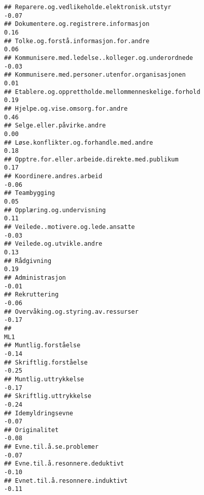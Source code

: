 \documentclass[
]{article}
\begin{document}
\begin{verbatim}
## Reparere.og.vedlikeholde.elektronisk.utstyr                                      -0.07
## Dokumentere.og.registrere.informasjon                                             0.16
## Tolke.og.forstå.informasjon.for.andre                                             0.06
## Kommunisere.med.ledelse..kolleger.og.underordnede                                -0.03
## Kommunisere.med.personer.utenfor.organisasjonen                                   0.01
## Etablere.og.opprettholde.mellommenneskelige.forhold                               0.19
## Hjelpe.og.vise.omsorg.for.andre                                                   0.46
## Selge.eller.påvirke.andre                                                         0.00
## Løse.konflikter.og.forhandle.med.andre                                            0.18
## Opptre.for.eller.arbeide.direkte.med.publikum                                     0.17
## Koordinere.andres.arbeid                                                         -0.06
## Teambygging                                                                       0.05
## Opplæring.og.undervisning                                                         0.11
## Veilede..motivere.og.lede.ansatte                                                -0.03
## Veilede.og.utvikle.andre                                                          0.13
## Rådgivning                                                                        0.19
## Administrasjon                                                                   -0.01
## Rekruttering                                                                     -0.06
## Overvåking.og.styring.av.ressurser                                               -0.17
##                                                                                    ML1
## Muntlig.forståelse                                                               -0.14
## Skriftlig.forståelse                                                             -0.25
## Muntlig.uttrykkelse                                                              -0.17
## Skriftlig.uttrykkelse                                                            -0.24
## Idemyldringsevne                                                                 -0.07
## Originalitet                                                                     -0.08
## Evne.til.å.se.problemer                                                          -0.07
## Evne.til.å.resonnere.deduktivt                                                   -0.10
## Evnet.til.å.resonnere.induktivt                                                  -0.11

\end{verbatim}
\end{document}
